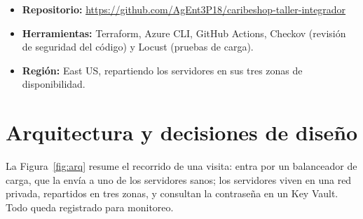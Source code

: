 \documentclass[11pt,letterpaper]{article}
\begin{document}
\begin{itemize}
  \item \textbf{Repositorio:} \url{https://github.com/AgEnt3P18/caribeshop-taller-integrador}
  \item \textbf{Herramientas:} Terraform, Azure CLI, GitHub Actions, Checkov (revisión de seguridad
        del código) y Locust (pruebas de carga).
  \item \textbf{Región:} East US, repartiendo los servidores en sus tres zonas de disponibilidad.
\end{itemize}

\section{Arquitectura y decisiones de diseño}
La Figura~\ref{fig:arq} resume el recorrido de una visita: entra por un balanceador de carga, que
la envía a uno de los servidores sanos; los servidores viven en una red privada, repartidos en
tres zonas, y consultan la contraseña en un Key Vault. Todo queda registrado para monitoreo.
\end{document}
